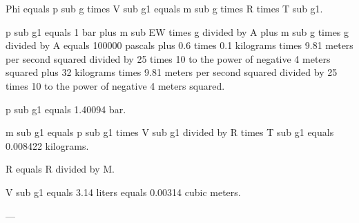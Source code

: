 Phi equals p sub g times V sub g1 equals m sub g times R times T sub g1.  

p sub g1 equals 1 bar plus m sub EW times g divided by A plus m sub g times g divided by A equals 100000 pascals plus 0.6 times 0.1 kilograms times 9.81 meters per second squared divided by 25 times 10 to the power of negative 4 meters squared plus 32 kilograms times 9.81 meters per second squared divided by 25 times 10 to the power of negative 4 meters squared.  

p sub g1 equals 1.40094 bar.  

m sub g1 equals p sub g1 times V sub g1 divided by R times T sub g1 equals 0.008422 kilograms.  

R equals R divided by M.  

V sub g1 equals 3.14 liters equals 0.00314 cubic meters.  

---